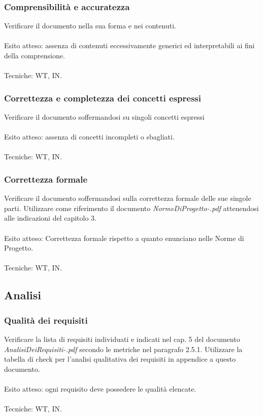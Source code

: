 \subsubsection*{Comprensibilit\`a e accuratezza}

Verificare il documento nella sua forma e nei contenuti.
\\\\
Esito atteso: assenza di contenuti eccessivamente generici ed interpretabili ai
fini della comprensione.
\\\\
Tecniche: WT, IN.

\subsubsection*{Correttezza e completezza dei concetti espressi}

Verificare il documento soffermandosi su singoli concetti espressi
\\\\
Esito atteso: assenza di concetti incompleti o sbagliati.
\\\\
Tecniche: WT, IN.

\subsubsection*{Correttezza formale}

Verificare il documento soffermandosi sulla correttezza formale delle sue 
singole parti. Utilizzare come riferimento il documento
\emph{NormeDiProgetto-\versionenormeprogetto.pdf} attenendosi alle indicazioni del capitolo 3.
\\\\
Esito atteso: Correttezza formale rispetto a quanto enunciano nelle Norme di
Progetto.
\\\\
Tecniche: WT, IN.


\subsection{Analisi}

\subsubsection*{Qualit\`a dei requisiti}

Verificare la lista di requisiti individuati e indicati nel cap. 5 del documento
\emph{AnalisiDeiRequisiti-\versioneAR.pdf} secondo le metriche nel paragrafo 2.5.1.
Utilizzare la tabella di check per l'analisi qualitativa dei requisiti in
appendice a questo documento.
\\\\
Esito atteso: ogni requisito deve possedere le qualit\`a elencate.
\\\\
Tecniche: WT, IN.


